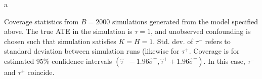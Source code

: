 \documentclass[12pt]{article}
\begin{document}
	\begin{table}
        \centering
    \begin{threeparttable}a
    \caption{Monte Carlo Results: $B = 2000, \tau = 1, K = H = 1$}
		
        \label{tab:tab1}
    \begin{tablenotes}
      \small
      \item Coverage statistics from $B = 2000$ simulations generated from the model specified above. The true ATE in the simulation is $\tau = 1$, and unobserved confounding is chosen such that simulation satisfies $K = H = 1$. Std. dev. of $\tau^-$ refers to standard deviation between simulation runs (likewise for $\tau^+$. Coverage is for estimated 95\% confidence intervals $(\hat{\tau}^- - 1.96 \hat{\sigma}^-, \hat{\tau}^+ + 1.96 \hat{\sigma}^+)$. In this case, $\tau^-$ and $\tau^+$ coincide. 
    \end{tablenotes}
  \end{threeparttable}
  \end{table}
\end{document}
